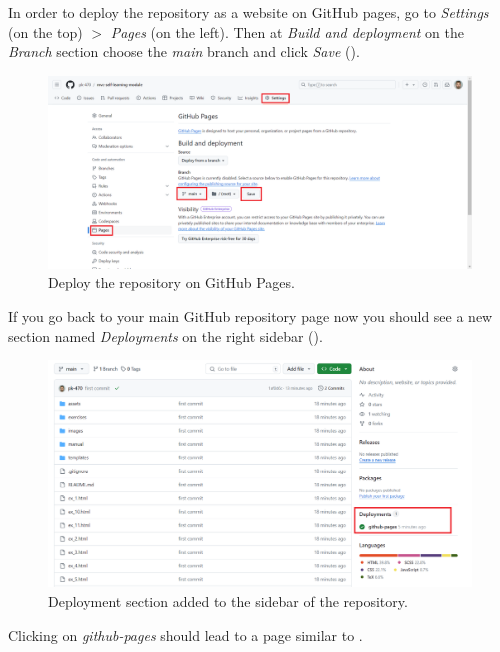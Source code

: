 \documentclass[a4paper,10pt]{article}
\begin{document}
In order to deploy the repository as a website on GitHub pages, go to \emph{Settings} (on the top) $>$ \emph{Pages} (on the left). Then at \emph{Build and deployment} on the \emph{Branch} section choose the \emph{main} branch and click \emph{Save} ().

\begin{figure}[htbp]
    \centering
    \includegraphics[width=\textwidth]{mvc_deploy.png}
    \caption{Deploy the repository on GitHub Pages.}
    \label{mvc_deploy}   
\end{figure}

If you go back to your main GitHub repository page now you should see a new section named \emph{Deployments} on the right sidebar ().

\begin{figure}[htbp]
    \centering
    \includegraphics[width=\textwidth]{mvc_deployment_added.png}
    \caption{Deployment section added to the sidebar of the repository.}
    \label{mvc_deployment_added}   
\end{figure}

Clicking on \emph{github-pages} should lead to a page similar to .
\end{document}
